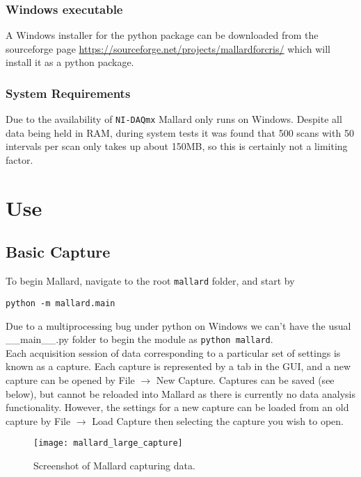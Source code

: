 \documentclass[10pt,a4paper]{article}
\begin{document}
\subsubsection{Windows executable}
A Windows installer for the python package can be downloaded from the sourceforge page \url{https://sourceforge.net/projects/mallardforcris/} which will install it as a python package.

\subsubsection{System Requirements}
Due to the availability of \texttt{NI-DAQmx} Mallard only runs on Windows. Despite all data being held in RAM, during system tests it was found that 500 scans with 50 intervals per scan only takes up about 150MB, so this is certainly not a limiting factor.

\section{Use}
\subsection{Basic Capture}
To begin Mallard, navigate to the root \texttt{mallard} folder, and start by
\begin{verbatim}
python -m mallard.main
\end{verbatim}
Due to a multiprocessing bug under python on Windows we can't have the usual \_\_main\_\_.py folder to begin the module as \texttt{python mallard}. \\

Each acquisition session of data corresponding to a particular set of settings is known as a capture. Each capture is represented by a tab in the GUI, and a new capture can be opened by File $\rightarrow$ New Capture. Captures can be saved (see below), but cannot be reloaded into Mallard as there is currently no data analysis functionality. However, the settings for a new capture can be loaded from an old capture by File $\rightarrow$ Load Capture then selecting the capture you wish to open.\\

\begin{figure}[h!]

  \centering
    \texttt{[image: mallard\_large\_capture]}
      \caption{Screenshot of Mallard capturing data.}
\end{figure}
\end{document}
